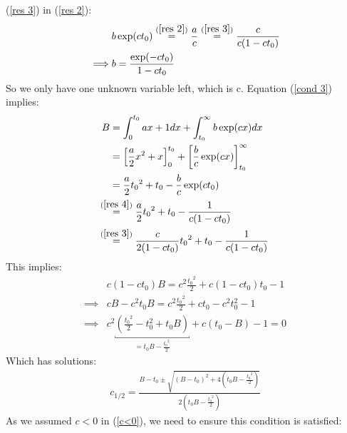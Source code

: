 \documentclass[11pt, a4paper]{article}
\makeatletter
\newcommand*{\sm@shstack}[3][lr]{
	\mathrel{%
		\smashoperator[#1]{\mathop{#2}^{#3}}}
}
\newcommand*{\lx@rrow}[2]{ %
	\sm@shstack[l]{#2}{#1}
}
\newcommand*{\lxeq}[1]{\lx@rrow{#1}{=}} %
\makeatother
\begin{document}
    \noindent (\ref{res 3}) in (\ref{res 2}):
    \begin{align}
        &b\exp(c t_0)\stackrel{(\ref{res 2})}=\frac{a}{c}\stackrel{(\ref{res 3})}{=} \frac{c}{c(1-ct_0)}\nonumber\\
        \implies & b = \frac{\exp(-ct_0)}{1-ct_0} \label{res 4}
    \end{align}
    So we only have one unknown variable left, which is c. Equation (\ref{cond 3}) implies:
    \begin{align}
        B &= \int_0^{t_0} a x+1 dx + \int_{t_0}^\infty b\exp(cx)dx 
        \nonumber\\
        &= \left[\frac{a}{2}x^2 +x\right]_0^{t_0} + \left[\frac{b}{c} \exp(cx)\right]_{t_0}^\infty 
        \nonumber\\
        &=\frac{a}{2}{t_0}^2 +t_0- \frac{b}{c}\exp(c t_0)
        \label{c<0}\\
        &\lxeq{(\ref{res 4})} \frac{a}{2}{t_0}^2 +t_0-\frac{1}{c(1-ct_0)}
        \nonumber \\
        &\lxeq{(\ref{res 3})} \frac{c}{2(1-ct_0)}{t_0}^2 +t_0-\frac{1}{c(1-ct_0)} \nonumber
    \end{align}
    This implies:
    \begin{align*}
        &c(1-c t_0) B = c^2 \frac{{t_0}^2}{2} + c(1-c t_0)t_0 -1\\
        \implies & cB - c^2t_0B = c^2\frac{{t_0}^2}{2} + ct_0 - c^2t_0^2 -1\\
        \implies & c^2 \underbracket{\left(\frac{{t_0}^2}{2} - t_0^2 + t_0B\right)}_{= t_0 B - \frac{{t_0}^2}{2}} 
        + c\left(t_0 -B \right) -1 = 0
    \end{align*}
    Which has solutions:
    \begin{align}
        c_{1/2} = \frac{B-t_0 \pm \sqrt{(B-t_0)^2 + 4 \left(t_0 B - \frac{{t_0}^2}{2}\right)}}{2 \left(t_0 B - \frac{{t_0}^2}{2}\right)}
    \end{align}
    As we assumed \(c<0\) in (\ref{c<0}), we need to ensure this condition is satisfied:
\end{document}
